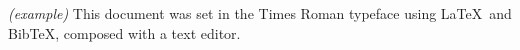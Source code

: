 \textit{(example)} This document was set in the Times Roman typeface using \LaTeX\ and Bib\TeX , composed with a text editor. 

